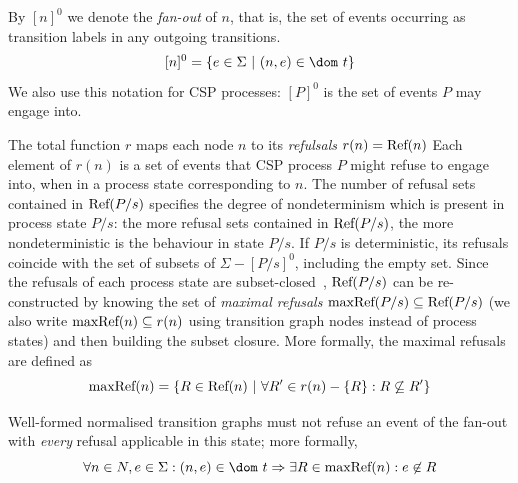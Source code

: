 By $[n]^0$ we denote the \emph{fan-out} of $n$, that is, the set of events occurring as transition labels in any outgoing transitions.
$$
[n]^0 = \{ e\in\Sigma~|~(n,e)\in\dom~t \}
$$
We also use this notation for CSP processes: $[P]^0$ is the set of events $P$ may engage into.




The total function $r$ maps each node $n$ to its \emph{refulsals} $r(n) = \text{Ref}(n)$ Each element of $r(n)$ is a set of events that 
CSP process $P$ might refuse to engage into, when in a process state corresponding to $n$.
The number of refusal sets contained in $\text{Ref}(P/s)$ specifies the degree of nondeterminism
which is present in process state $P/s$: the more refusal sets contained in  $\text{Ref}(P/s)$,
the more nondeterministic is the behaviour in state $P/s$. If $P/s$ is deterministic,
its refusals coincide with the set of subsets of $\Sigma - [P/s]^0$, including the 
empty set. Since the refusals of each process state are 
subset-closed~\cite{Hoare:1985:CSP:3921,Roscoe2010}, $\text{Ref}(P/s)$ can be re-constructed
by knowing the set of \emph{maximal refusals} $\text{maxRef}(P/s)\subseteq\text{Ref}(P/s)$ (we also write $\text{maxRef}(n) \subseteq r(n)$ using transition graph nodes instead of 
process states) and then  building the subset closure. More formally, the maximal refusals 
are defined as
$$
\text{maxRef}(n) = \{ R \in\text{Ref}(n)~|~\forall R'\in r(n) - \{ R\}: R \not\subseteq R'\}
$$

Well-formed normalised transition graphs must not refuse an event of the fan-out
with {\it every} refusal applicable in this state; more formally,
\begin{equation}
\label{eq:wellformedg}
\forall n\in N, e\in\Sigma: (n,e)\in\dom~t \Rightarrow 
\exists R\in \maxrefs(n): e\not\in R  
\end{equation}







%

